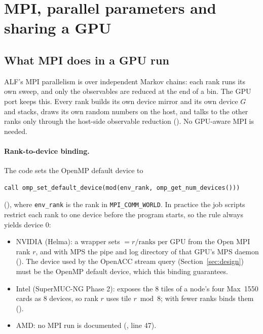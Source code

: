 \section{MPI, parallel parameters and sharing a GPU}
\label{sec:mpi}

\subsection{What MPI does in a GPU run}

ALF's MPI parallelism is over independent Markov chains: each rank runs its own sweep, and only the observables are reduced at the end of a bin. The GPU port keeps this. Every rank builds its own device mirror and its own device $G$ and stacks, draws its own random numbers on the host, and talks to the other ranks only through the host-side observable reduction (). No GPU-aware MPI is needed.

\paragraph{Rank-to-device binding.} The code sets the OpenMP default device to
\begin{lstlisting}
call omp_set_default_device(mod(env_rank, omp_get_num_devices()))
\end{lstlisting}
(), where \texttt{env\_rank} is the rank in \texttt{MPI\_COMM\_WORLD}. In practice the job scripts restrict each rank to one device before the program starts, so the rule always yields device 0:
\begin{itemize}
\item NVIDIA (Helma): a wrapper sets  $=r/\text{ranks per GPU}$ from the Open MPI rank $r$, and with MPS the pipe and log directory of that GPU's MPS daemon (). The device used by the OpenACC stream query (Section~\ref{sec:design}) must be the OpenMP default device, which this binding guarantees.
\item Intel (SuperMUC-NG Phase 2):  exposes the 8 tiles of a node's four Max~1550 cards as 8 devices, so rank $r$ uses tile $r\bmod8$; with fewer ranks  binds them ().
\item AMD: no MPI run is documented (, line 47).
\end{itemize}

